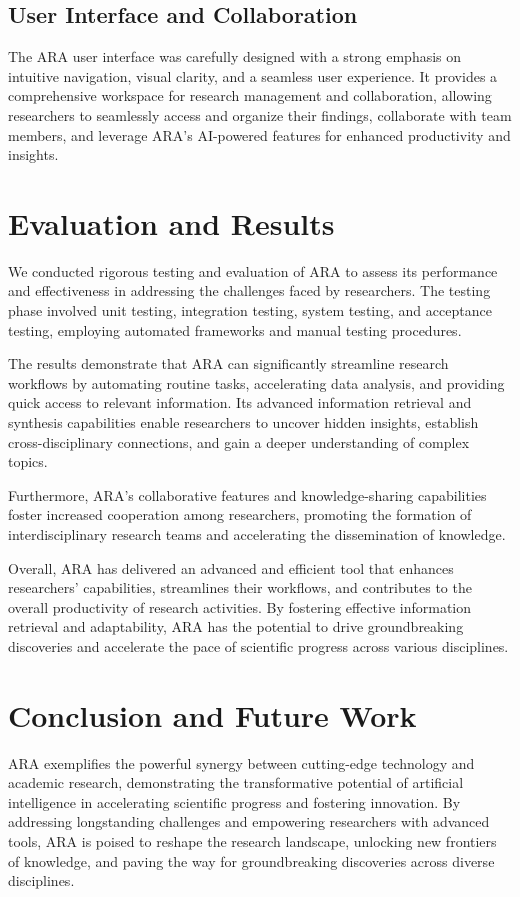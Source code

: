 \documentclass[a4paper,conference]{IEEEtran}
\begin{document}
\subsection{User Interface and Collaboration}
The ARA user interface was carefully designed with a strong emphasis on intuitive navigation, visual clarity, and a seamless user experience. It provides a comprehensive workspace for research management and collaboration, allowing researchers to seamlessly access and organize their findings, collaborate with team members, and leverage ARA's AI-powered features for enhanced productivity and insights.

\section{Evaluation and Results}
We conducted rigorous testing and evaluation of ARA to assess its performance and effectiveness in addressing the challenges faced by researchers. The testing phase involved unit testing, integration testing, system testing, and acceptance testing, employing automated frameworks and manual testing procedures.

The results demonstrate that ARA can significantly streamline research workflows by automating routine tasks, accelerating data analysis, and providing quick access to relevant information. Its advanced information retrieval and synthesis capabilities enable researchers to uncover hidden insights, establish cross-disciplinary connections, and gain a deeper understanding of complex topics.

Furthermore, ARA's collaborative features and knowledge-sharing capabilities foster increased cooperation among researchers, promoting the formation of interdisciplinary research teams and accelerating the dissemination of knowledge.

Overall, ARA has delivered an advanced and efficient tool that enhances researchers' capabilities, streamlines their workflows, and contributes to the overall productivity of research activities. By fostering effective information retrieval and adaptability, ARA has the potential to drive groundbreaking discoveries and accelerate the pace of scientific progress across various disciplines.

\section{Conclusion and Future Work}
ARA exemplifies the powerful synergy between cutting-edge technology and academic research, demonstrating the transformative potential of artificial intelligence in accelerating scientific progress and fostering innovation. By addressing longstanding challenges and empowering researchers with advanced tools, ARA is poised to reshape the research landscape, unlocking new frontiers of knowledge, and paving the way for groundbreaking discoveries across diverse disciplines.
\end{document}
